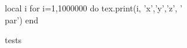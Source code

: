 \documentclass{book}
\begin{document}
\begin{luacode}
local i
for i=1,1000000 do
   tex.print(i, 'x','y','z', '\\par')
end   
\end{luacode}

tests
\end{document}
